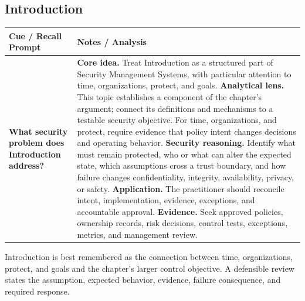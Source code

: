 \documentclass[11pt]{article}
\newcommand{\CornellHeader}{%
\rowcolor{Navy}\color{white}\bfseries Cue / Recall Prompt & \color{white}\bfseries Notes / Analysis\\\hline}
\newcommand{\CornellRow}[2]{%
\cellcolor{CueGray}\RaggedRight\textbf{#1} & \RaggedRight #2\\\hline}
\begin{document}
\subsection*{Introduction}
\begin{longtable}{>{\RaggedRight\arraybackslash}p{}|>{\RaggedRight\arraybackslash}p{}}
\CornellHeader
\CornellRow{What security problem does Introduction address?}{\textbf{Core idea.} Treat Introduction as a structured part of Security Management Systems, with particular attention to time, organizations, protect, and goals. \textbf{Analytical lens.} This topic establishes a component of the chapter's argument; connect its definitions and mechanisms to a testable security objective. For time, organizations, and protect, require evidence that policy intent changes decisions and operating behavior. \textbf{Security reasoning.} Identify what must remain protected, who or what can alter the expected state, which assumptions cross a trust boundary, and how failure changes confidentiality, integrity, availability, privacy, or safety. \textbf{Application.} The practitioner should reconcile intent, implementation, evidence, exceptions, and accountable approval. \textbf{Evidence.} Seek approved policies, ownership records, risk decisions, control tests, exceptions, metrics, and management review.}
\end{longtable}
\begin{topicsummary}
Introduction is best remembered as the connection between time, organizations, protect, and goals and the chapter's larger control objective. A defensible review states the assumption, expected behavior, evidence, failure consequence, and required response.
\end{topicsummary}
\end{document}
